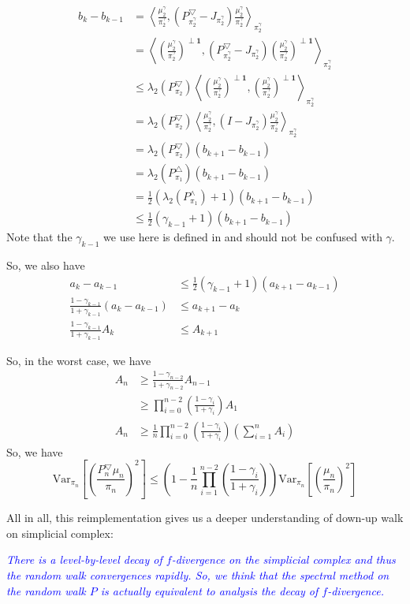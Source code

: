 \documentclass{article}
\def\<{\left\langle}
\def\>{\right\rangle}
\begin{document}
\begin{align*}
  b_{k} - b_{k-1}
  &= \<\frac{\mu_2^\gamma}{\pi_2^\gamma}, (P_{\pi_2^\gamma}^{\bigtriangledown} - J_{\pi_2^\gamma})\frac{\mu_2^\gamma}{\pi_2^\gamma}\>_{\pi_2^\gamma} \\
  &= \<(\frac{\mu_2^\gamma}{\pi_2^\gamma})^{\perp \mathbf{1}}, (P_{\pi_2^\gamma}^{\bigtriangledown} - J_{\pi_2^\gamma})(\frac{\mu_2^\gamma}{\pi_2^\gamma})^{\perp \mathbf{1}}\>_{\pi_2^\gamma} \\
  &\leq \lambda_2(P_{\pi_2}^\bigtriangledown)\<(\frac{\mu_2^\gamma}{\pi_2^\gamma})^{\perp \mathbf{1}}, (\frac{\mu_2^\gamma}{\pi_2^\gamma})^{\perp \mathbf{1}}\>_{\pi_2^\gamma} \\
  &= \lambda_2(P_{\pi_2}^\bigtriangledown)\<\frac{\mu_2^\gamma}{\pi_2^\gamma}, (I - J_{\pi_2^\gamma}) \frac{\mu_2^\gamma}{\pi_2^\gamma}\>_{\pi_2^\gamma} \\
  &= \lambda_2(P_{\pi_2}^\bigtriangledown) (b_{k+1} - b_{k-1}) \\
  &= \lambda_2(P_{\pi_1}^\bigtriangleup) (b_{k+1} - b_{k-1}) \\
  &= \frac{1}{2}(\lambda_2(P_{\pi_1}^\land) + 1) (b_{k+1} - b_{k-1}) \\
  &\leq \frac{1}{2}(\gamma_{k-1} + 1) (b_{k+1} - b_{k-1})
\end{align*}
Note that the $\gamma_{k-1}$ we use here is defined in \cite{alev2020improved} and should not be confused with $\gamma$.

So, we also have
\begin{align*}
  a_k - a_{k-1} &\leq \frac{1}{2}(\gamma_{k-1} + 1) (a_{k+1} - a_{k-1}) \\
  \frac{1 - \gamma_{k-1}}{1 + \gamma_{k-1}} (a_k - a_{k-1}) &\leq a_{k+1} - a_k \\
  \frac{1 - \gamma_{k-1}}{1 + \gamma_{k-1}} A_k & \leq A_{k+1}
\end{align*}

So, in the worst case, we have
\begin{align*}
  A_n
  &\geq \frac{1 - \gamma_{n-2}}{1 + \gamma_{n-2}} A_{n-1} \\
  &\geq \prod_{i=0}^{n-2} \left(\frac{1 - \gamma_i}{1 + \gamma_i}\right) A_1 \\
  A_n &\geq \frac{1}{n}\prod_{i=0}^{n-2} \left(\frac{1 - \gamma_i}{1 + \gamma_i}\right) \left(\sum_{i=1}^n A_i\right)
\end{align*}
So, we have
\[
  \mathrm{Var}_{\pi_n} \left[\left(\frac{P_n^{\bigtriangledown}\mu_n}{\pi_n}\right)^2\right]
  \leq 
  \left(1 - \frac{1}{n}\prod_{i=1}^{n-2} \left(\frac{1 - \gamma_i}{1 + \gamma_i}\right)\right)\mathrm{Var}_{\pi_n} \left[\left(\frac{\mu_n}{\pi_n}\right)^2\right]
\]

All in all, this reimplementation gives us a deeper understanding of down-up walk on simplicial complex:

\textcolor{blue}{\it{
    There is a level-by-level decay of $f$-divergence on the simplicial complex and thus the random walk convergences rapidly.
    So, we think that the spectral method on the random walk $P$ is actually equivalent to analysis the decay of $f$-divergence.
}}

\clearpage


\end{document}
